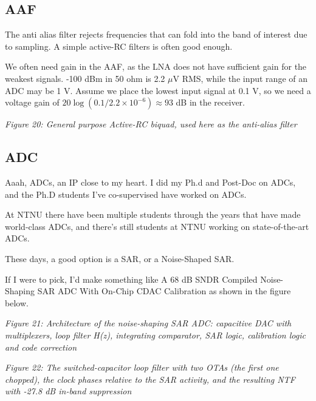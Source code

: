 \subsection{AAF}\label{aaf}

The anti alias filter rejects frequencies that can fold into the band of
interest due to sampling. A simple active-RC filters is often good
enough.

We often need gain in the AAF, as the LNA does not have sufficient gain
for the weakest signals. -100 dBm in 50 ohm is 2.2 \(\mu\)V RMS, while
the input range of an ADC may be 1 V. Assume we place the lowest input
signal at 0.1 V, so we need a voltage gain of
\(20\log(0.1/2.2\times 10^{-6}) \approx 93\) dB in the receiver.


{
\centering
{}
}

\emph{Figure 20: General purpose Active-RC biquad, used here as the
anti-alias filter}

\subsection{ADC}\label{adc}

Aaah, ADCs, an IP close to my heart. I did my Ph.d and Post-Doc on ADCs,
and the Ph.D students I've co-supervised have worked on ADCs.

At NTNU there have been multiple students through the years that have
made world-class ADCs, and there's still students at NTNU working on
state-of-the-art ADCs.

These days, a good option is a SAR, or a Noise-Shaped SAR.

If I were to pick, I'd make something like A 68 dB SNDR Compiled
Noise-Shaping SAR ADC With On-Chip CDAC Calibration
 as shown in the figure below.


{
\centering
{}
}

\emph{Figure 21: Architecture of the noise-shaping SAR ADC: capacitive
DAC with multiplexers, loop filter H(z), integrating comparator, SAR
logic, calibration logic and code correction}


{
\centering
{}
}

\emph{Figure 22: The switched-capacitor loop filter with two OTAs (the
first one chopped), the clock phases relative to the SAR activity, and
the resulting NTF with -27.8 dB in-band suppression}

